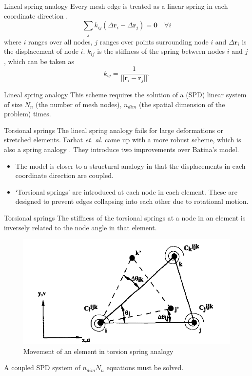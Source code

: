 \documentclass[t,12pt]{beamer}
\begin{document}
\begin{frame}{Lineal spring analogy}
	Every mesh edge is treated as a linear spring in each coordinate direction .
	 \begin{equation}
	 \sum_j k_{ij}(\Delta \mathbf{r}_i - \Delta \mathbf{r}_j) = \mathbf{0} \quad \forall i
	 \label{spring}
	 \end{equation}
	 where $i$ ranges over all nodes, $j$ ranges over points surrounding node $i$ and $\Delta \mathbf{r}_i$ is the displacement of node $i$.
	 $k_{ij}$ is the stiffness of the spring between nodes $i$ and $j$, which can be taken as
	 \begin{equation}
	 k_{ij} = \frac{1}{||\mathbf{r}_i - \mathbf{r}_j||}.
	 \end{equation}
\end{frame}
\begin{frame}{Lineal spring analogy}
	This scheme requires the solution of a (SPD) linear system of size $N_n$ (the number of mesh nodes), $n_{dim}$ (the spatial dimension of the problem) times.
\end{frame}

\begin{frame}{Torsional springs}
The lineal spring analogy fails for large deformations or stretched elements. Farhat \emph{et. al.} came up with a more robust scheme, which is also a spring analogy .
\vspace{0.2in}
They introduce two improvements over Batina's model.
\begin{itemize}
	\item The model is closer to a structural analogy in that the displacements in each coordinate direction are coupled.
	\item `Torsional springs' are introduced at each node in each element. These are designed to prevent edges collapsing into each other due to rotational motion.
\end{itemize}
\end{frame}

\begin{frame}{Torsional springs}
The stiffness of the torsional springs at a node in an element is inversely related to the node angle in that element.
 \begin{figure}
 	\centering
 	\includegraphics[scale=0.25]{torsionspring}
 	\caption{Movement of an element in torsion spring analogy}
 	\label{fig:torsion}
 \end{figure}
 A coupled SPD system of $n_{dim} N_n$ equations must be solved.
\end{frame}
\end{document}
